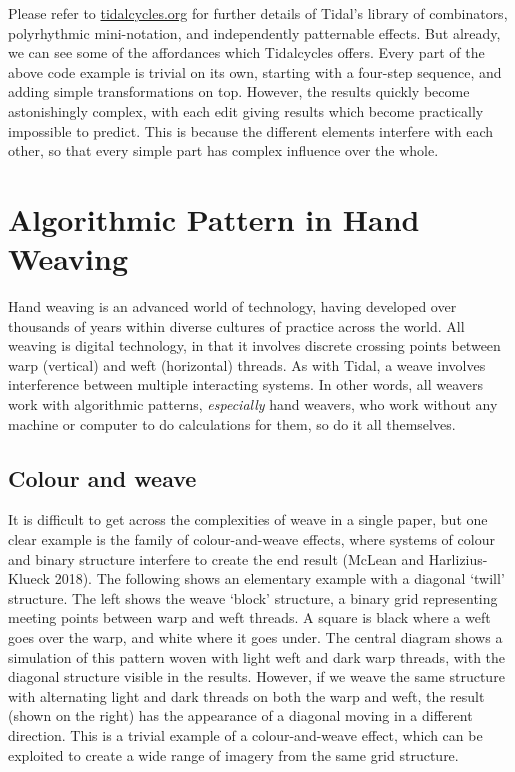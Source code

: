 \documentclass{nime-alternate} %
\begin{document}
Please refer to \href{https://tidalcycles.org}{tidalcycles.org} for
further details of Tidal's library of combinators, polyrhythmic
mini-notation, and independently patternable effects. But already, we
can see some of the affordances which Tidalcycles offers. Every part of
the above code example is trivial on its own, starting with a four-step
sequence, and adding simple transformations on top. However, the results
quickly become astonishingly complex, with each edit giving results
which become practically impossible to predict. This is because the
different elements interfere with each other, so that every simple part
has complex influence over the whole.

\hypertarget{algorithmic-pattern-in-hand-weaving}{%
\section{Algorithmic Pattern in Hand
Weaving}\label{algorithmic-pattern-in-hand-weaving}}

Hand weaving is an advanced world of technology, having developed over
thousands of years within diverse cultures of practice across the world.
All weaving is digital technology, in that it involves discrete crossing
points between warp (vertical) and weft (horizontal) threads. As with
Tidal, a weave involves interference between multiple interacting
systems. In other words, all weavers work with algorithmic patterns,
\emph{especially} hand weavers, who work without any machine or computer
to do calculations for them, so do it all themselves.

\hypertarget{colour-and-weave}{%
\subsection{Colour and weave}\label{colour-and-weave}}

It is difficult to get across the complexities of weave in a single
paper, but one clear example is the family of colour-and-weave effects,
where systems of colour and binary structure interfere to create the end
result (McLean and Harlizius-Klueck 2018). The following shows an
elementary example with a diagonal `twill' structure. The left shows the
weave `block' structure, a binary grid representing meeting points
between warp and weft threads. A square is black where a weft goes over
the warp, and white where it goes under. The central diagram shows a
simulation of this pattern woven with light weft and dark warp threads,
with the diagonal structure visible in the results. However, if we weave
the same structure with alternating light and dark threads on both the
warp and weft, the result (shown on the right) has the appearance of a
diagonal moving in a different direction. This is a trivial example of a
colour-and-weave effect, which can be exploited to create a wide range
of imagery from the same grid structure.
\end{document}
